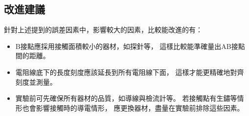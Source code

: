 \documentclass[12pt]{article}
\begin{document}
        \subsection{改進建議}
            針對上述提到的誤差因素中，影響較大的因素，比較能改進的有：
            \begin{itemize}
                \item B接點應採用接觸面積較小的器材，如探針等，
                    這樣比較能準確量出AB接點間的距離。
                \item 電阻線底下的長度刻度應該延長到所有電阻線下面，
                    這樣才能更精確地對齊刻度並測量。
                \item 實驗前可先確保所有器材的品質，如導線與檢流計等。
                    若接觸點有生鏽等情形也會影響接觸時的導電情形，
                    應更換器材，盡量在實驗前排除這些因素。
            \end{itemize}
            
            
        
\end{document}
